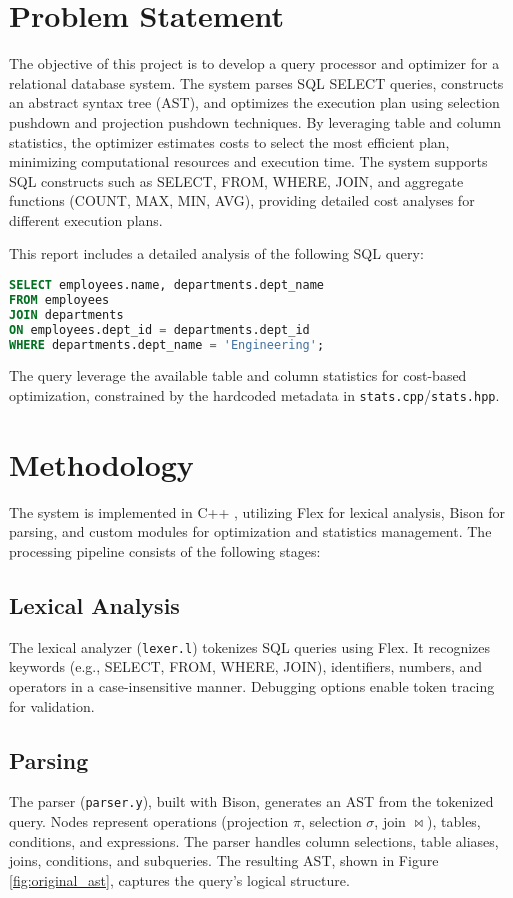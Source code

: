 \documentclass[12pt,a4paper]{article}
\begin{document}
\tableofcontents


\newpage

\section{Problem Statement}
The objective of this project is to develop a query processor and optimizer for a relational database system. The system parses SQL SELECT queries, constructs an abstract syntax tree (AST), and optimizes the execution plan using selection pushdown and projection pushdown techniques. By leveraging table and column statistics, the optimizer estimates costs to select the most efficient plan, minimizing computational resources and execution time. The system supports SQL constructs such as SELECT, FROM, WHERE, JOIN, and aggregate functions (COUNT, MAX, MIN, AVG), providing detailed cost analyses for different execution plans.

This report includes a detailed analysis of the following SQL query:

\begin{lstlisting}[language=SQL]
SELECT employees.name, departments.dept_name 
FROM employees 
JOIN departments 
ON employees.dept_id = departments.dept_id 
WHERE departments.dept_name = 'Engineering';
\end{lstlisting}

The query leverage the available table and column statistics for cost-based optimization, constrained by the hardcoded metadata in \texttt{stats.cpp}/\texttt{stats.hpp}.

\section{Methodology}
The system is implemented in C++
, utilizing Flex for lexical analysis, Bison for parsing, and custom modules for optimization and statistics management. The processing pipeline consists of the following stages:

\subsection{Lexical Analysis}
The lexical analyzer (\texttt{lexer.l}) tokenizes SQL queries using Flex. It recognizes keywords (e.g., SELECT, FROM, WHERE, JOIN), identifiers, numbers, and operators in a case-insensitive manner. Debugging options enable token tracing for validation.

\subsection{Parsing}
The parser (\texttt{parser.y}), built with Bison, generates an AST from the tokenized query. Nodes represent operations (projection $\pi$, selection $\sigma$, join $\bowtie$), tables, conditions, and expressions. The parser handles column selections, table aliases, joins, conditions, and subqueries. The resulting AST, shown in Figure \ref{fig:original_ast}, captures the query’s logical structure.
\end{document}
